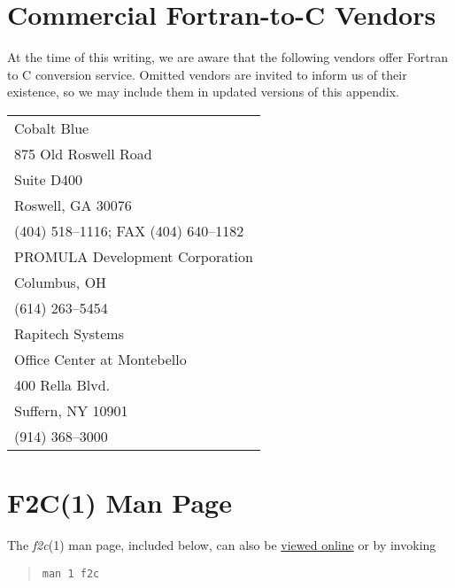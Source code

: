 \documentclass[10pt,a4paper]{article}
\begin{document}
\begin{appendices}
\section{Commercial Fortran-to-C Vendors} \label{app:vendors}

At the time of this writing, we are aware that the following vendors offer Fortran to C conversion service. Omitted vendors are invited to inform us of their existence, so we may include them in updated versions of this appendix.

\begin{center}
\begin{tabular}{l}
Cobalt Blue\\
875 Old Roswell Road\\
Suite D400\\
Roswell, GA 30076\\
(404) 518–1116; FAX (404) 640–1182
\\[4ex]
PROMULA Development Corporation\\
Columbus, OH\\
(614) 263–5454
\\[4ex]
Rapitech Systems\\
Office Center at Montebello\\
400 Rella Blvd.\\
Suffern, NY 10901\\
(914) 368–3000
\end{tabular}
\end{center}

\section{F2C(1) Man Page} \label{app:manpage}

The \emph{f2c}(1) man page, included below, can also be \href{http://www.netlib.org/f2c/f2c.1}{viewed online} or by invoking
\begin{quote}
\begin{verbatim}
man 1 f2c
\end{verbatim}
\end{quote}


\end{appendices}
\end{document}
